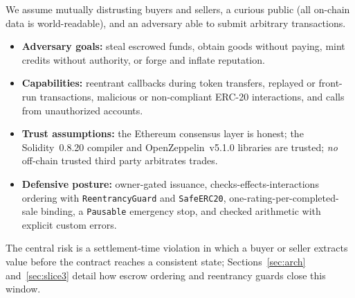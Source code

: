 We assume mutually distrusting buyers and sellers, a curious public (all on-chain data is world-readable), and an adversary able to submit arbitrary transactions.
\begin{itemize}
  \item \textbf{Adversary goals:} steal escrowed funds, obtain goods without paying, mint credits without authority, or forge and inflate reputation.
  \item \textbf{Capabilities:} reentrant callbacks during token transfers, replayed or front-run transactions, malicious or non-compliant ERC-20 interactions, and calls from unauthorized accounts.
  \item \textbf{Trust assumptions:} the Ethereum consensus layer is honest; the Solidity~0.8.20 compiler and OpenZeppelin~v5.1.0 libraries are trusted; \emph{no} off-chain trusted third party arbitrates trades.
  \item \textbf{Defensive posture:} owner-gated issuance, checks-effects-interactions ordering with \texttt{ReentrancyGuard} and \texttt{SafeERC20}, one-rating-per-completed-sale binding, a \texttt{Pausable} emergency stop, and checked arithmetic with explicit custom errors.
\end{itemize}
The central risk is a settlement-time violation in which a buyer or seller extracts value before the contract reaches a consistent state; Sections~\ref{sec:arch} and~\ref{sec:slice3} detail how escrow ordering and reentrancy guards close this window.
